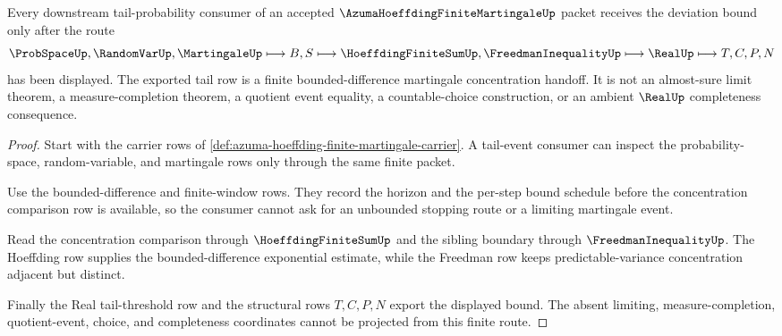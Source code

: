 \begin{theorem}
\label{thm:azuma-hoeffding-finite-window-tail-handoff}
Every downstream tail-probability consumer of an accepted $\AzumaHoeffdingFiniteMartingaleUp$ packet receives the deviation bound only after the route
$$
\ProbSpaceUp,\RandomVarUp,\MartingaleUp \longmapsto B,S \longmapsto \HoeffdingFiniteSumUp,\FreedmanInequalityUp \longmapsto \RealUp \longmapsto T,C,P,N
$$
has been displayed. The exported tail row is a finite bounded-difference martingale concentration handoff. It is not an almost-sure limit theorem, a measure-completion theorem, a quotient event equality, a countable-choice construction, or an ambient $\RealUp$ completeness consequence.
\end{theorem}
\begin{proof}
Start with the carrier rows of \autoref{def:azuma-hoeffding-finite-martingale-carrier}. A tail-event consumer can inspect the probability-space, random-variable, and martingale rows only through the same finite packet.

Use the bounded-difference and finite-window rows. They record the horizon and the per-step bound schedule before the concentration comparison row is available, so the consumer cannot ask for an unbounded stopping route or a limiting martingale event.

Read the concentration comparison through $\HoeffdingFiniteSumUp$ and the sibling boundary through $\FreedmanInequalityUp$. The Hoeffding row supplies the bounded-difference exponential estimate, while the Freedman row keeps predictable-variance concentration adjacent but distinct.

Finally the Real tail-threshold row and the structural rows $T,C,P,N$ export the displayed bound. The absent limiting, measure-completion, quotient-event, choice, and completeness coordinates cannot be projected from this finite route.
\end{proof}



